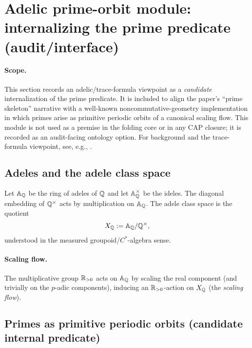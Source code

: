 \section{Adelic prime-orbit module: internalizing the prime predicate (audit/interface)}
\label{sec:adelic_prime_orbit_module}

\paragraph{Scope.}
\AuditTag This section records an adelic/trace-formula viewpoint as a \emph{candidate} internalization of the prime predicate.
It is included to align the paper's ``prime skeleton'' narrative with a well-known noncommutative-geometry implementation in which primes arise as primitive periodic orbits of a canonical scaling flow.
This module is not used as a premise in the folding core or in any CAP closure; it is recorded as an audit-facing ontology option.
For background and the trace-formula viewpoint, see, e.g., \cite{Connes1994,Connes1999,BostConnes1995}.

\subsection{Adeles and the adele class space}
\label{subsec:adele_class_space}

\begin{definition}
\label{def:adeles_adele_class_space}
\AuditTag Let $\mathbb{A}_{\mathbb{Q}}$ be the ring of adeles of $\mathbb{Q}$ and let $\mathbb{A}_{\mathbb{Q}}^\times$ be the ideles.
The diagonal embedding of $\mathbb{Q}^\times$ acts by multiplication on $\mathbb{A}_{\mathbb{Q}}$.
The adele class space is the quotient
\[
X_{\mathbb{Q}}:=\mathbb{A}_{\mathbb{Q}}/\mathbb{Q}^\times,
\]
understood in the measured groupoid/$C^*$-algebra sense.
\end{definition}

\paragraph{Scaling flow.}
\AuditTag The multiplicative group $\mathbb{R}_{>0}$ acts on $\mathbb{A}_{\mathbb{Q}}$ by scaling the real component (and trivially on the $p$-adic components), inducing an $\mathbb{R}_{>0}$-action on $X_{\mathbb{Q}}$ (the \emph{scaling flow}).

\subsection{Primes as primitive periodic orbits (candidate internal predicate)}
\label{subsec:primes_as_orbits}

